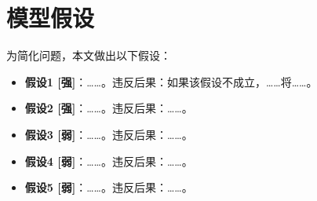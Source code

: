 \section{模型假设}

为简化问题，本文做出以下假设：

\begin{itemize}[itemindent=2em]
  \item \textbf{假设1 [强]}：……。违反后果：如果该假设不成立，……将……。
  \item \textbf{假设2 [强]}：……。违反后果：……。
  \item \textbf{假设3 [弱]}：……。违反后果：……。
  \item \textbf{假设4 [弱]}：……。违反后果：……。
  \item \textbf{假设5 [弱]}：……。违反后果：……。
\end{itemize}

